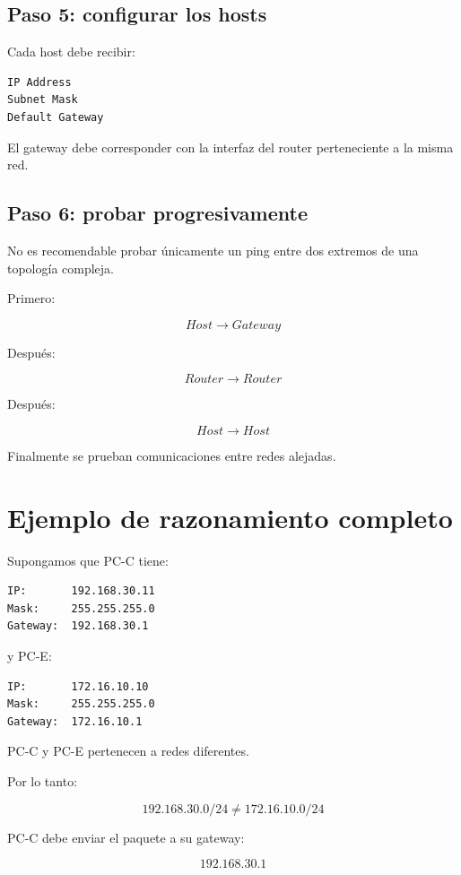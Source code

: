 \documentclass[12pt]{article}
\begin{document}
\subsection{Paso 5: configurar los hosts}

Cada host debe recibir:

\begin{lstlisting}
IP Address
Subnet Mask
Default Gateway
\end{lstlisting}

El gateway debe corresponder con la interfaz del router perteneciente a la
misma red.


\subsection{Paso 6: probar progresivamente}

No es recomendable probar únicamente un ping entre dos extremos de una
topología compleja.

Primero:

\[
Host \rightarrow Gateway
\]

Después:

\[
Router \rightarrow Router
\]

Después:

\[
Host \rightarrow Host
\]

Finalmente se prueban comunicaciones entre redes alejadas.


\section{Ejemplo de razonamiento completo}

Supongamos que PC-C tiene:

\begin{lstlisting}
IP:       192.168.30.11
Mask:     255.255.255.0
Gateway:  192.168.30.1
\end{lstlisting}

y PC-E:

\begin{lstlisting}
IP:       172.16.10.10
Mask:     255.255.255.0
Gateway:  172.16.10.1
\end{lstlisting}

PC-C y PC-E pertenecen a redes diferentes.

Por lo tanto:

\[
192.168.30.0/24
\neq
172.16.10.0/24
\]

PC-C debe enviar el paquete a su gateway:

\[
192.168.30.1
\]
\end{document}
